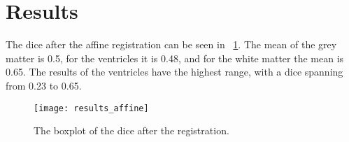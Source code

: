 \section{Results}
The dice after the affine registration can be seen in ~\ref{fig:result_affine}. The mean of the grey matter is 0.5, for the ventricles it is 0.48, and for the white matter the mean is 0.65. The results of the ventricles have the highest range, with a dice spanning from 0.23 to 0.65.

\begin{figure}[!h]
	\centering
	\texttt{[image: results\_affine]}
	\caption{The boxplot of the dice after the registration.}
	\label{fig:result_affine}
\end{figure}